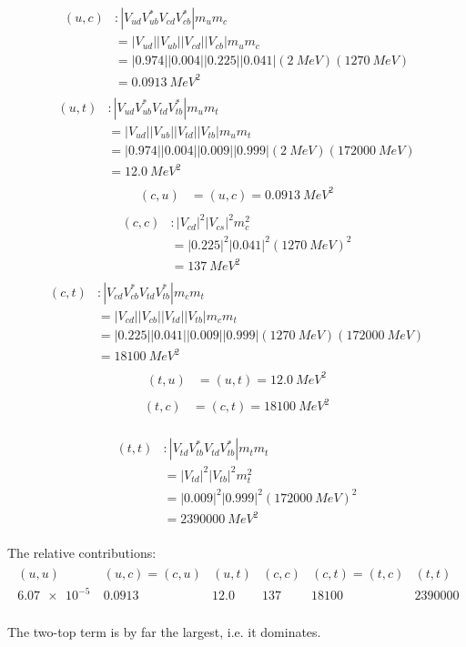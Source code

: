 \begin{align*}
    (u, c) &: |V_{ud} V_{ub}^* V_{cd} V_{cb}^*| m_u m_{c} \\
    &= |V_{ud}| |V_{ub}| |V_{cd}| |V_{cb}| m_u m_{c} \\
    &= |0.974| |0.004| |0.225| |0.041| (\SI{2}{MeV}) (\SI{1270}{MeV}) \\
    &= \SI{0.0913}{MeV^2} \\
\end{align*}
\begin{align*}
    (u, t) &: |V_{ud} V_{ub}^* V_{td} V_{tb}^*| m_u m_{t} \\
    &= |V_{ud}| |V_{ub}| |V_{td}| |V_{tb}| m_u m_{t} \\
    &= |0.974| |0.004| |0.009| |0.999| (\SI{2}{MeV}) (\SI{172000}{MeV}) \\
    &= \SI{12.0}{MeV^2} \\
\end{align*}
\begin{align*}
    (c, u) &= (u, c) = \SI{0.0913}{MeV^2} \\
\end{align*}
\begin{align*}
    (c, c) &: |V_{cd}|^2 |V_{cs}|^2 m_c^2 \\
    &=|0.225|^2 |0.041|^2 (\SI{1270}{MeV})^2 \\
    &= \SI{137}{MeV^2} \\
\end{align*}
\begin{align*}
    (c, t) &: |V_{cd} V_{cb}^* V_{td} V_{tb}^*| m_c m_{t} \\
    &= |V_{cd}| |V_{cb}| |V_{td}| |V_{tb}| m_c m_{t} \\
    &= |0.225| |0.041| |0.009| |0.999| (\SI{1270}{MeV}) (\SI{172000}{MeV}) \\
    &= \SI{18100}{MeV^2} \\
\end{align*}
\begin{align*}
    (t, u) &= (u, t) = \SI{12.0}{MeV^2} \\
\end{align*}
\begin{align*}
    (t, c) &= (c, t) = \SI{18100}{MeV^2} \\
\end{align*}

\begin{align*}
    (t, t) &: |V_{td} V_{tb}^* V_{td} V_{tb}^*| m_t m_{t} \\
    &= |V_{td}|^2 |V_{tb}|^2 m_t^2 \\
    &= |0.009|^2 |0.999|^2 (\SI{172000}{MeV})^2 \\
    &= \SI{2390000}{MeV^2} \\
\end{align*}

The relative contributions:
\begin{align*}
    \begin{matrix}
        (u,u) & (u,c)=(c,u) & (u,t) & (c,c) & (c,t)=(t,c) & (t,t) \\
        \SI{6.07e-5}{} & 0.0913 & 12.0 & 137 & 18100 & 2390000 \\
    \end{matrix}
\end{align*}

The two-top term is by far the largest, i.e. it dominates.
